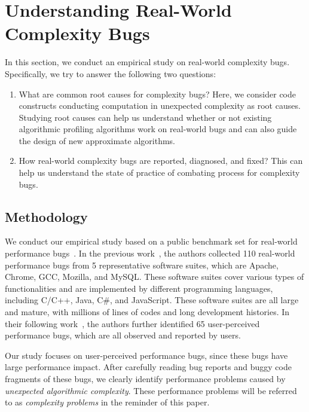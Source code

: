 \section{Understanding Real-World Complexity Bugs}
\label{sec:study}


In this section, we conduct an empirical study on real-world complexity bugs. 
Specifically, we try to answer the following two questions:

\begin{enumerate}

\item What are common root causes for complexity bugs? 
Here, we consider code constructs conducting computation in unexpected complexity as root causes. 
Studying root causes can help us understand whether or not 
existing algorithmic profiling algorithms work on real-world bugs 
and can also guide the design of new approximate algorithms. 

\item How real-world complexity bugs are reported, diagnosed, and fixed?
This can help us understand the state of practice of combating process for complexity bugs. 

\end{enumerate}


\subsection{Methodology}
\label{sec:meth}

We conduct our empirical study based on a public benchmark set for 
real-world performance bugs~\cite{PerfBug,SongOOPSLA2014}. 
In the previous work~\cite{PerfBug}, 
the authors collected 110 real-world performance bugs from 5 representative 
software suites, which are Apache, Chrome, GCC, Mozilla, and MySQL. 
These software suites cover various types of functionalities and are implemented 
by different programming languages, including C/C++, Java, C\#, and JavaScript. 
These software suites are all large and mature, 
with millions of lines of codes and long development histories. 
In their following work~\cite{SongOOPSLA2014}, 
the authors further identified 65 user-perceived performance bugs, 
which are all observed and reported by users. 


Our study focuses on user-perceived performance bugs, 
since these bugs have large performance impact.
After carefully reading bug reports and buggy code fragments of these bugs,
we clearly identify \ComBugs performance problems 
caused by {\textit{unexpected algorithmic complexity}}.
These performance problems will be referred to as 
{\textit{complexity problems}} in the reminder of this paper.


